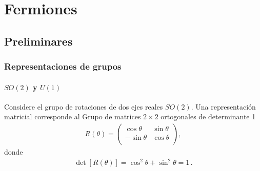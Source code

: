 \chapter{Fermiones}
\label{cha:princ-gauge-local} %

\section{Preliminares}

\subsection{Representaciones de grupos}

\subsubsection{$SO(2)$ y $U(1)$}
Considere el grupo de rotaciones de dos ejes reales $SO(2)$. Una representación matricial corresponde al Grupo de matrices $2\times 2$ ortogonales de determinante 1
\begin{align*}
  R(\theta)=
  \begin{pmatrix}
  \cos\theta &\sin\theta\\  
  -\sin\theta&\cos\theta\\  
  \end{pmatrix},
\end{align*}
donde
\begin{align*}
  \det[R(\theta)]=\cos^2\theta+\sin^2\theta=1\,.
\end{align*}

